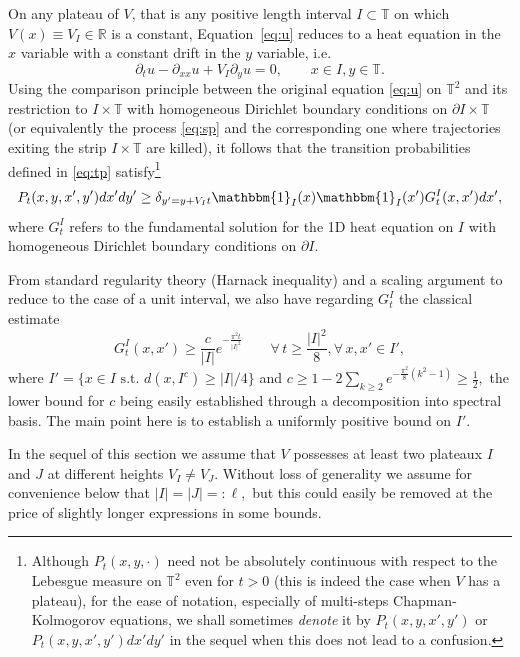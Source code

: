 \documentclass[12pt]{article}
\newcommand{\R}{\mathbb{R}}
\newcommand{\T}{\mathbb{T}}
\begin{document}
On any plateau of $V$, that is any positive length interval $I \subset \T$ on 
which $V(x) \equiv V_I \in \R$ 
is a constant, Equation~\eqref{eq:u} reduces to a heat equation in the $x$ variable 
with a constant drift in the $y$ variable, i.e. 
\begin{equation}
    \partial_tu-\partial_{xx}u+V_I\partial_yu=0,\qquad x\in I,y\in\mathbb{T}.
\end{equation}
Using the comparison principle between the  
original equation \eqref{eq:u} on $\T^2$ and its restriction to $I \times \T$ 
with homogeneous Dirichlet boundary conditions on $\partial I \times \T$ (or
equivalently the process \eqref{eq:sp} and the corresponding one where 
trajectories exiting the strip $I \times \T$ are killed), it
follows that the transition probabilities defined in \eqref{eq:tp}
satisfy\footnote{
Although $P_t(x, y, \cdot)$ need not be absolutely continuous with respect
to the Lebesgue measure on $\T^2$ even for $t > 0$ (this is indeed the case 
when $V$ has a plateau), for the ease of notation, especially of 
multi-steps Chapman-Kolmogorov equations, we shall sometimes {\it denote} 
it by $P_t(x,y, x',y')$ or $P_t(x,y,x',y') dx'dy'$ 
in the sequel when this does not lead to a confusion.}
\begin{equation}\label{eq:compare}
P_t(x,y,x',y') dx'dy' \geq \delta_{y'= y + V_It}
\mathbbm{1}_{I}(x)\mathbbm{1}_{I}(x') G_t^I(x, x')dx',
\end{equation}
where $G_t^I$ refers to the fundamental
solution for the 1D heat equation on $I$ with homogeneous 
Dirichlet boundary conditions on $\partial I.$ 

From standard regularity theory (Harnack inequality) and a scaling argument to reduce 
to the case of a unit interval, we also have regarding $G_t^I$ the classical estimate
\begin{equation}\label{eq:greenbound1d}
G_t^I(x, x') \geq \frac{c}{|I|}e^{-\frac{\pi^2t}{|I|^2}} \qquad \forall\, t \geq
\frac{|I|^2}{8}, \forall\, x, x' \in I',
\end{equation}
where $I' = \{x \in I \text{ s.t. } d(x,I^c) \geq |I|/4\}$ and 
$
c \geq 1 - 2 \sum_{k \geq 2} e^{-\frac{\pi^2}{8}(k^2-1)} \geq \frac12,
$
the lower bound for $c$ being easily established through a decomposition 
into spectral basis. The main point here is to establish a uniformly positive bound on $I'$.


\medskip

In the sequel of this section we assume that $V$ possesses at least two plateaux
$I$ and $J$ at different heights $V_I \neq V_J$. Without loss of generality
we assume for convenience below that $|I| = |J| =: \ell,$ but
this could easily be removed at the price of slightly longer expressions 
in some bounds.
\end{document}
